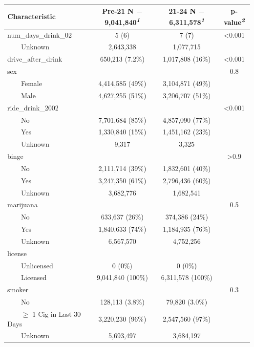 \documentclass[
]{article}
\begin{document}
\begin{table}[t]
\fontsize{12.0pt}{14.0pt}\selectfont
\begin{tabular*}{\linewidth}{@{\extracolsep{\fill}}lccc}
\toprule
\textbf{Characteristic} & \textbf{Pre-21}  N = 9,041,840\textsuperscript{\textit{1}} & \textbf{21-24}  N = 6,311,578\textsuperscript{\textit{1}} & \textbf{p-value}\textsuperscript{\textit{2}} \\ 
\midrule\addlinespace[2.5pt]
num\_days\_drink\_02 & 5 (6) & 7 (7) & <0.001 \\ 
    Unknown & 2,643,338 & 1,077,715 &  \\ 
drive\_after\_drink & 650,213 (7.2\%) & 1,017,808 (16\%) & <0.001 \\ 
sex &  &  & 0.8 \\ 
    Female & 4,414,585 (49\%) & 3,104,871 (49\%) &  \\ 
    Male & 4,627,255 (51\%) & 3,206,707 (51\%) &  \\ 
ride\_drink\_2002 &  &  & <0.001 \\ 
    No & 7,701,684 (85\%) & 4,857,090 (77\%) &  \\ 
    Yes & 1,330,840 (15\%) & 1,451,162 (23\%) &  \\ 
    Unknown & 9,317 & 3,325 &  \\ 
binge &  &  & >0.9 \\ 
    No & 2,111,714 (39\%) & 1,832,601 (40\%) &  \\ 
    Yes & 3,247,350 (61\%) & 2,796,436 (60\%) &  \\ 
    Unknown & 3,682,776 & 1,682,541 &  \\ 
marijuana &  &  & 0.5 \\ 
    No & 633,637 (26\%) & 374,386 (24\%) &  \\ 
    Yes & 1,840,633 (74\%) & 1,184,935 (76\%) &  \\ 
    Unknown & 6,567,570 & 4,752,256 &  \\ 
license &  &  &  \\ 
    Unlicensed & 0 (0\%) & 0 (0\%) &  \\ 
    Licensed & 9,041,840 (100\%) & 6,311,578 (100\%) &  \\ 
smoker &  &  & 0.3 \\ 
    No & 128,113 (3.8\%) & 79,820 (3.0\%) &  \\ 
    \ensuremath{\geq} 1 Cig in Last 30 Days & 3,220,230 (96\%) & 2,547,560 (97\%) &  \\ 
    Unknown & 5,693,497 & 3,684,197 &  \\ 

\end{tabular*}
\end{table}
\end{document}
